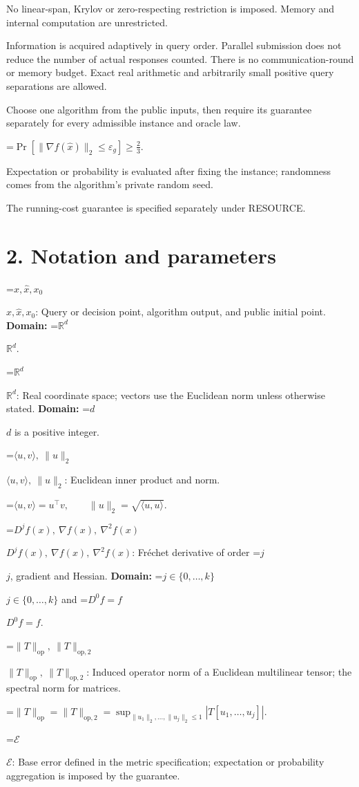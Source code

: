 \documentclass[10pt,a4paper]{article}
\newcommand{\AtlasMath}[1]{\par\begingroup\centering\setbox0=\hbox{$\displaystyle #1$}\ifdim\wd0>1.4\linewidth\typeout{ATLAS WIDE FORMULA: \the\wd0}\fi\ifdim\wd0>\linewidth\resizebox{\linewidth}{!}{\box0}\else\box0\fi\par\endgroup}
\newcommand{\AtlasInlineMath}[1]{\begingroup\setbox0=\hbox{$#1$}\ifdim\wd0>.4\linewidth\endgroup\AtlasMath{#1}\else\endgroup$#1$\fi}
\begin{document}
No linear-span, Krylov or zero-respecting restriction is imposed. Memory and internal computation are unrestricted.

Information is acquired adaptively in query order. Parallel submission does not reduce the number of actual responses counted. There is no communication-round or memory budget. Exact real arithmetic and arbitrarily small positive query separations are allowed.

Choose one algorithm from the public inputs, then require its guarantee separately for every admissible instance and oracle law.


\AtlasMath{\Pr\!\left[\|\nabla f(\widehat{x})\|_2\le \varepsilon_g\right]\ge\frac23.}


Expectation or probability is evaluated after fixing the instance; randomness comes from the algorithm's private random seed.

The running-cost guarantee is specified separately under RESOURCE.

\section{2. Notation and parameters}
\AtlasInlineMath{x,\widehat{x},x_0}: Query or decision point, algorithm output, and public initial point. \textbf{Domain:} \AtlasInlineMath{\mathbb{R}^d}.

\AtlasInlineMath{\mathbb{R}^d}: Real coordinate space; vectors use the Euclidean norm unless otherwise stated. \textbf{Domain:} \AtlasInlineMath{d} is a positive integer.

\AtlasInlineMath{\langle u,v\rangle,\ \|u\|_2}: Euclidean inner product and norm.


\AtlasMath{\langle u,v\rangle=u^\top v,\qquad\|u\|_2=\sqrt{\langle u,u\rangle}.}


\AtlasInlineMath{D^jf(x),\ \nabla f(x),\ \nabla^2f(x)}: Fréchet derivative of order \AtlasInlineMath{j}, gradient and Hessian. \textbf{Domain:} \AtlasInlineMath{j\in\{0,\ldots,k\}} and \AtlasInlineMath{D^0f=f}.

\AtlasInlineMath{\|T\|_{\mathrm{op}},\ \|T\|_{\mathrm{op},2}}: Induced operator norm of a Euclidean multilinear tensor; the spectral norm for matrices.


\AtlasMath{\|T\|_{\mathrm{op}}=\|T\|_{\mathrm{op},2}=\sup_{\|u_1\|_2,\ldots,\|u_j\|_2\le1}|T[u_1,\ldots,u_j]|.}


\AtlasInlineMath{\mathcal{E}}: Base error defined in the metric specification; expectation or probability aggregation is imposed by the guarantee.
\end{document}
